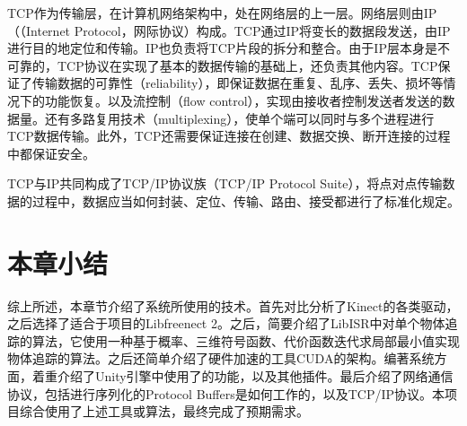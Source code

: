 	TCP作为传输层，在计算机网络架构中，处在网络层的上一层。网络层则由IP（（Internet Protocol，网际协议）构成。TCP通过IP将变长的数据段发送，由IP进行目的地定位和传输。IP也负责将TCP片段的拆分和整合。由于IP层本身是不可靠的，TCP协议在实现了基本的数据传输的基础上，还负责其他内容。TCP保证了传输数据的可靠性（reliability），即保证数据在重复、乱序、丢失、损坏等情况下的功能恢复。以及流控制（flow control），实现由接收者控制发送者发送的数据量。还有多路复用技术（multiplexing），使单个端可以同时与多个进程进行TCP数据传输。此外，TCP还需要保证连接在创建、数据交换、断开连接的过程中都保证安全。
	
	TCP与IP共同构成了TCP/IP协议族（TCP/IP Protocol Suite），将点对点传输数据的过程中，数据应当如何封装、定位、传输、路由、接受都进行了标准化规定。

\section{本章小结}
综上所述，本章节介绍了系统所使用的技术。首先对比分析了Kinect的各类驱动，之后选择了适合于项目的Libfreenect 2。之后，简要介绍了LibISR中对单个物体追踪的算法，它使用一种基于概率、三维符号函数、代价函数迭代求局部最小值实现物体追踪的算法。之后还简单介绍了硬件加速的工具CUDA的架构。编著系统方面，着重介绍了Unity引擎中使用了的功能，以及其他插件。最后介绍了网络通信协议，包括进行序列化的Protocol Buffers是如何工作的，以及TCP/IP协议。本项目综合使用了上述工具或算法，最终完成了预期需求。